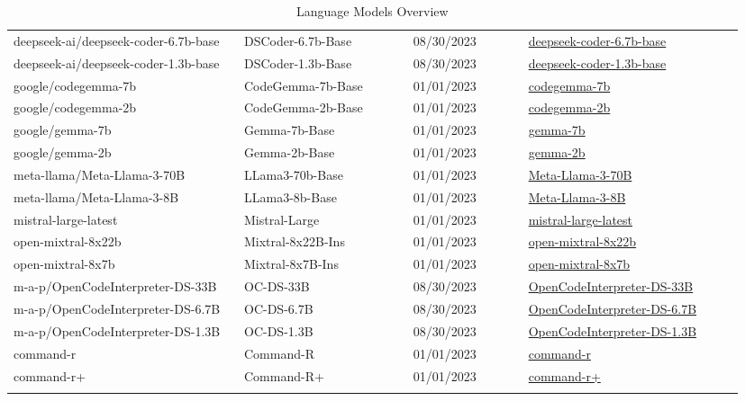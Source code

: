\begin{longtable}{|p{0.3\linewidth}|p{0.22\linewidth}|p{0.15\linewidth}|p{0.28\linewidth}|}
deepseek-ai/deepseek-coder-6.7b-base & DSCoder-6.7b-Base & 08/30/2023 & \href{https://huggingface.co/deepseek-ai/deepseek-coder-6.7b-base}{deepseek-coder-6.7b-base} \\ 
deepseek-ai/deepseek-coder-1.3b-base & DSCoder-1.3b-Base & 08/30/2023 & \href{https://huggingface.co/deepseek-ai/deepseek-coder-1.3b-base}{deepseek-coder-1.3b-base} \\ 
google/codegemma-7b & CodeGemma-7b-Base & 01/01/2023 & \href{https://huggingface.co/google/codegemma-7b}{codegemma-7b} \\ 
google/codegemma-2b & CodeGemma-2b-Base & 01/01/2023 & \href{https://huggingface.co/google/codegemma-2b}{codegemma-2b} \\ 
google/gemma-7b & Gemma-7b-Base & 01/01/2023 & \href{https://huggingface.co/google/gemma-7b}{gemma-7b} \\ 
google/gemma-2b & Gemma-2b-Base & 01/01/2023 & \href{https://huggingface.co/google/gemma-2b}{gemma-2b} \\ 
meta-llama/Meta-Llama-3-70B & LLama3-70b-Base & 01/01/2023 & \href{https://huggingface.co/meta-llama/Meta-Llama-3-70B}{Meta-Llama-3-70B} \\ 
meta-llama/Meta-Llama-3-8B & LLama3-8b-Base & 01/01/2023 & \href{https://huggingface.co/meta-llama/Meta-Llama-3-8B}{Meta-Llama-3-8B} \\ 
mistral-large-latest & Mistral-Large & 01/01/2023 & \href{https://mistral.ai/news/mistral-large/}{mistral-large-latest} \\ 
open-mixtral-8x22b & Mixtral-8x22B-Ins & 01/01/2023 & \href{https://mistral.ai/news/mixtral-8x22b/}{open-mixtral-8x22b} \\ 
open-mixtral-8x7b & Mixtral-8x7B-Ins & 01/01/2023 & \href{https://mistral.ai/news/mixtral-8x7b/}{open-mixtral-8x7b} \\ 
m-a-p/OpenCodeInterpreter-DS-33B & OC-DS-33B & 08/30/2023 & \href{https://huggingface.co/m-a-p/OpenCodeInterpreter-DS-33B/}{OpenCodeInterpreter-DS-33B} \\ 
m-a-p/OpenCodeInterpreter-DS-6.7B & OC-DS-6.7B & 08/30/2023 & \href{https://huggingface.co/m-a-p/OpenCodeInterpreter-DS-6.7B/}{OpenCodeInterpreter-DS-6.7B} \\ 
m-a-p/OpenCodeInterpreter-DS-1.3B & OC-DS-1.3B & 08/30/2023 & \href{https://huggingface.co/m-a-p/OpenCodeInterpreter-DS-1.3B/}{OpenCodeInterpreter-DS-1.3B} \\ 
command-r & Command-R & 01/01/2023 & \href{https://docs.cohere.com/docs/models}{command-r} \\ 
command-r+ & Command-R+ & 01/01/2023 & \href{https://docs.cohere.com/docs/models}{command-r+} \\ 
   \hline
    \caption{Language Models Overview}
    \label{tab:models_list}
    \end{longtable}
